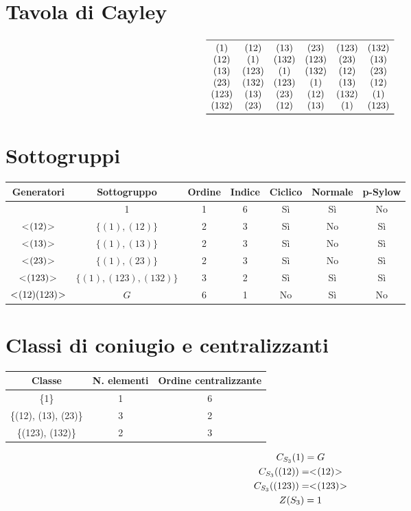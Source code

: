 \section{Tavola di Cayley}
\label{sec:s3_caylay}

\begin{center}
	\[
	\begin{array}{cccccc}
		\midrule
		(1) & (12) & (13) & (23) & (123) & (132) \\
		(12) & (1) & (132) & (123) & (23) & (13) \\
		(13) & (123) & (1) & (132) & (12) & (23) \\
		(23) & (132) & (123) & (1) & (13) & (12) \\
		(123) & (13) & (23) & (12) & (132) & (1) \\
		(132) & (23) & (12) & (13) & (1) & (123) \\
		\bottomrule
	\end{array}
	\]
\end{center}

\section{Sottogruppi}
\label{sec:s3_sottogruppi}

\begin{center}
	\begin{tabular}{ccccccc}
		\toprule
		Generatori & Sottogruppo & Ordine & Indice & Ciclico & Normale & p-Sylow \\
		\midrule
		 & 1 & 1 & 6 & Sì & Sì & No \\
		$< \negmedspace (12) \negmedspace >$ & $\{(1), (12)\}$ & 2 & 3 & Sì & No & Sì \\
		$< \negmedspace (13) \negmedspace >$ & $\{(1), (13)\}$ & 2 & 3 & Sì & No & Sì \\
		$< \negmedspace (23) \negmedspace >$ & $\{(1), (23)\}$ & 2 & 3 & Sì & No & Sì \\
		$< \negmedspace (123) \negmedspace >$ & $\{(1), (123), (132)\}$ & 3 & 2 & Sì & Sì & Sì \\
		$< \negmedspace (12)(123) \negmedspace >$ & $G$ & 6 & 1 & No & Sì & No \\
		\bottomrule
	\end{tabular}
\end{center}

\section{Classi di coniugio e centralizzanti}
\label{sec:s3_classi_coniugio}

\begin{center}
	\begin{tabular}{ccc}
		\toprule
		Classe & N. elementi & Ordine centralizzante \\
		\midrule
		\{1\} & 1 & 6 \\
		\{(12), (13), (23)\} & 3 & 2 \\
		\{(123), (132)\} & 2 & 3 \\
		\bottomrule
	\end{tabular}
\end{center}

\begin{gather*}
	C_{S_3}(1) = G \\
	C_{S_3}((12)) = < \negmedspace (12) \negmedspace > \\
	C_{S_3}((123)) = < \negmedspace (123) \negmedspace > \\
	Z(S_3) = 1
\end{gather*}
